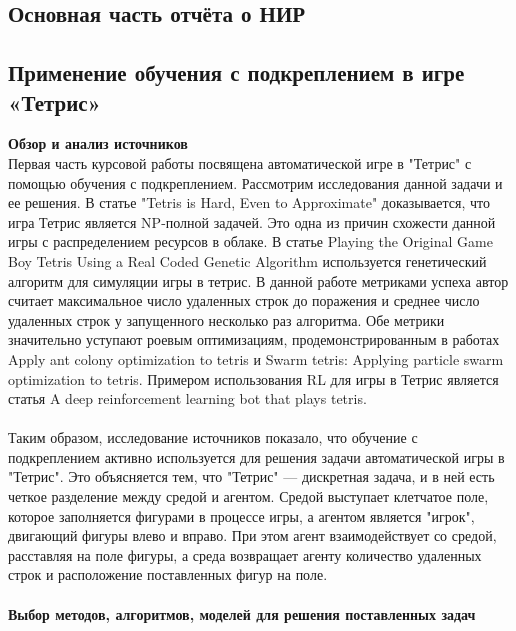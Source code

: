 \documentclass[draft]{article}
\begin{document}
\newpage
\begin{center}
\section {Основная часть отчёта о НИР}
\end{center}
\begin{center}
\item\subsection{Применение обучения с подкреплением в игре «Тетрис»}
\end{center}
\textbf{Обзор и анализ источников}\\
Первая часть курсовой работы посвящена автоматической игре в "Тетрис" с помощью обучения с подкреплением. Рассмотрим исследования данной задачи и ее решения. В статье "Tetris is Hard, Even to Approximate"\cite{litlink5} доказывается, что игра Тетрис является NP-полной задачей. Это одна из причин схожести данной игры с распределением ресурсов в облаке\cite{litlink6}. В статье Playing the Original Game Boy Tetris Using a Real Coded Genetic Algorithm\cite{litlink7} используется генетический алгоритм для симуляции игры в тетрис. В данной работе метриками успеха автор считает максимальное число удаленных строк до поражения и среднее число удаленных строк у запущенного несколько раз алгоритма. Обе метрики значительно уступают роевым оптимизациям,  продемонстрированным в работах Apply ant colony optimization to tetris\cite{litlink8} и Swarm tetris: Applying particle swarm optimization to tetris\cite{litlink9}. Примером использования RL для игры в Тетрис является статья A deep reinforcement learning bot that plays tetris\cite{litlink10}.\\~\\
Таким образом, исследование источников показало, что обучение с подкреплением активно используется для решения задачи автоматической игры в "Тетрис". Это объясняется тем, что "Тетрис" — дискретная задача, и в ней есть четкое разделение между средой и агентом. Средой выступает клетчатое поле, которое заполняется фигурами в процессе игры, а агентом является "игрок", двигающий фигуры влево и вправо. При этом агент взаимодействует со средой, расставляя на поле фигуры, а среда возвращает агенту количество удаленных строк и расположение поставленных фигур на поле.\\~\\
\textbf{Выбор методов, алгоритмов, моделей для решения поставленных задач}\\
\end{document}
